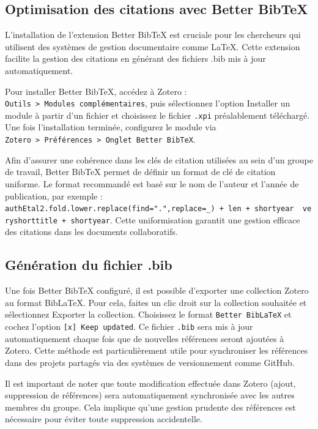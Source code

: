 \documentclass[
  letterpaper,
  DIV=11,
  numbers=noendperiod]{scrreprt}
\begin{document}
\subsection{Optimisation des citations avec Better
BibTeX}\label{optimisation-des-citations-avec-better-bibtex}

L'installation de l'extension Better BibTeX est cruciale pour les
chercheurs qui utilisent des systèmes de gestion documentaire comme
LaTeX. Cette extension facilite la gestion des citations en générant des
fichiers .bib mis à jour automatiquement.

Pour installer Better BibTeX, accédez à Zotero :
\texttt{Outils\ \textgreater{}\ Modules\ complémentaires}, puis
sélectionnez l'option Installer un module à partir d'un fichier et
choisissez le fichier \texttt{.xpi} préalablement téléchargé. Une fois
l'installation terminée, configurez le module via
\texttt{Zotero\ \textgreater{}\ Préférences\ \textgreater{}\ Onglet\ Better\ BibTeX}.

Afin d'assurer une cohérence dans les clés de citation utilisées au sein
d'un groupe de travail, Better BibTeX permet de définir un format de clé
de citation uniforme. Le format recommandé est basé sur le nom de
l'auteur et l'année de publication, par exemple :
\texttt{authEtal2.fold.lower.replace(find=".",replace=\_)\ +\ len\ +\ shortyear\ \textbar{}\ veryshorttitle\ +\ shortyear}.
Cette uniformisation garantit une gestion efficace des citations dans
les documents collaboratifs.

\subsection{Génération du fichier
.bib}\label{guxe9nuxe9ration-du-fichier-.bib}

Une fois Better BibTeX configuré, il est possible d'exporter une
collection Zotero au format BibLaTeX. Pour cela, faites un clic droit
sur la collection souhaitée et sélectionnez Exporter la collection.
Choisissez le format \texttt{Better\ BibLaTeX} et cochez l'option
\texttt{{[}x{]}\ Keep\ updated}. Ce fichier \texttt{.bib} sera mis à
jour automatiquement chaque fois que de nouvelles références seront
ajoutées à Zotero. Cette méthode est particulièrement utile pour
synchroniser les références dans des projets partagés via des systèmes
de versionnement comme GitHub.

Il est important de noter que toute modification effectuée dans Zotero
(ajout, suppression de références) sera automatiquement synchronisée
avec les autres membres du groupe. Cela implique qu'une gestion prudente
des références est nécessaire pour éviter toute suppression
accidentelle.
\end{document}
